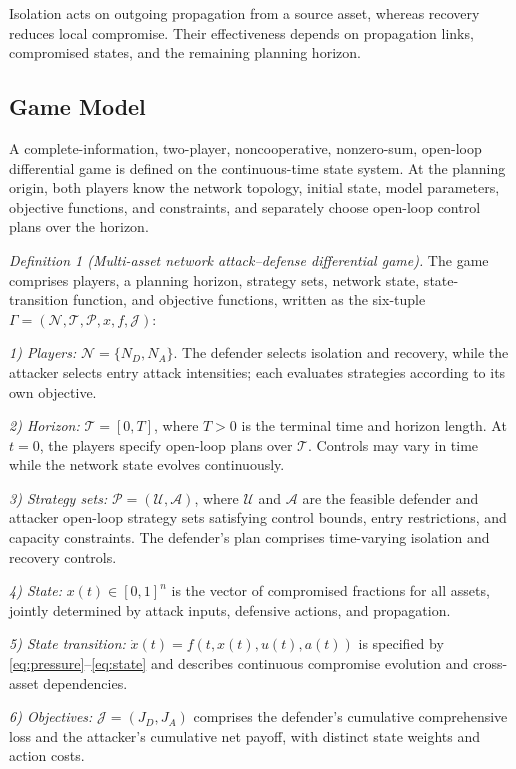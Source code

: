 \documentclass[conference,letterpaper]{IEEEtran}
\begin{document}
Isolation acts on outgoing propagation from a source asset, whereas recovery reduces local compromise. Their effectiveness depends on propagation links, compromised states, and the remaining planning horizon.

\subsection{Game Model}
A complete-information, two-player, noncooperative, nonzero-sum, open-loop differential game is defined on the continuous-time state system. At the planning origin, both players know the network topology, initial state, model parameters, objective functions, and constraints, and separately choose open-loop control plans over the horizon.

\emph{Definition 1 (Multi-asset network attack--defense differential game).} The game comprises players, a planning horizon, strategy sets, network state, state-transition function, and objective functions, written as the six-tuple $\Gamma=(\mathcal N,\mathcal T,\mathcal P,x,f,\mathcal J)$:

\emph{1) Players:} $\mathcal N=\{N_D,N_A\}$. The defender selects isolation and recovery, while the attacker selects entry attack intensities; each evaluates strategies according to its own objective.

\emph{2) Horizon:} $\mathcal T=[0,T]$, where $T>0$ is the terminal time and horizon length. At $t=0$, the players specify open-loop plans over $\mathcal T$. Controls may vary in time while the network state evolves continuously.

\emph{3) Strategy sets:} $\mathcal P=(\mathcal U,\mathcal A)$, where $\mathcal U$ and $\mathcal A$ are the feasible defender and attacker open-loop strategy sets satisfying control bounds, entry restrictions, and capacity constraints. The defender's plan comprises time-varying isolation and recovery controls.

\emph{4) State:} $x(t)\in[0,1]^n$ is the vector of compromised fractions for all assets, jointly determined by attack inputs, defensive actions, and propagation.

\emph{5) State transition:} $\dot x(t)=f(t,x(t),u(t),a(t))$ is specified by \eqref{eq:pressure}--\eqref{eq:state} and describes continuous compromise evolution and cross-asset dependencies.

\emph{6) Objectives:} $\mathcal J=(J_D,J_A)$ comprises the defender's cumulative comprehensive loss and the attacker's cumulative net payoff, with distinct state weights and action costs.
\end{document}
